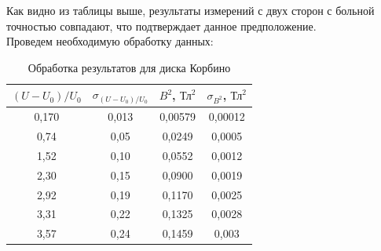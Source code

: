 \documentclass[a4paper,12pt]{extarticle}
\begin{document}
\noindent Как видно из таблицы выше, результаты измерений с двух сторон с больной точностью совпадают, что подтверждает данное предположение.\\
Проведем необходимую обработку данных:
\begin{table}[H]
\centering
\begin{tabular}{|c|c|c|c|}
\hline
$(U - U_0)/U_0$  & $\sigma_{(U - U_0)/U_0}$ & $B^2$, $\text{Тл}^2$ & $\sigma_{B^2}$, $\text{Тл}^2$ \\ \hline
0,170 & 0,013 & 0,00579 & 0,00012 \\ \hline
0,74 & 0,05 & 0,0249 & 0,0005 \\ \hline
1,52 & 0,10 & 0,0552 & 0,0012 \\ \hline
2,30 & 0,15 & 0,0900 & 0,0019 \\ \hline
2,92 & 0,19 & 0,1170 & 0,0025 \\ \hline
3,31 & 0,22 & 0,1325 & 0,0028 \\ \hline
3,57 & 0,24 & 0,1459 & 0,003  \\ \hline
\end{tabular}
\caption{Обработка результатов для диска Корбино}
\end{table}
\end{document}
